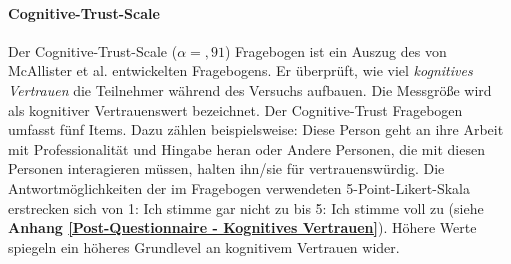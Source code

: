 \documentclass[a4paper,11pt]{article}%
\renewcommand{\\}{\vspace*{0.5\baselineskip} \newline}
\begin{document}
{%

		\paragraph{Cognitive-Trust-Scale}
Der Cognitive-Trust-Scale ($\alpha =,91$) Fragebogen ist ein Auszug des von McAllister et al. \citep[S. 37]{mcallister1995affect} entwickelten Fragebogens. Er überprüft, wie viel \textit{kognitives Vertrauen} die Teilnehmer während des Versuchs aufbauen. Die Messgröße wird als kognitiver Vertrauenswert bezeichnet. Der Cognitive-Trust Fragebogen umfasst fünf Items. Dazu zählen beispielsweise: \glqq{}Diese Person geht an ihre Arbeit mit Professionalität und Hingabe heran\dq{} oder \glqq{}Andere Personen, die mit diesen Personen interagieren müssen, halten ihn/sie für vertrauenswürdig\dq{}. Die Antwortmöglichkeiten der im Fragebogen verwendeten 5-Point-Likert-Skala erstrecken sich von 1: \glqq{}Ich stimme gar nicht zu \dq{} bis 5: \glqq{}Ich stimme voll zu\dq{} (siehe \textbf{Anhang \ref{Post-Questionnaire - Kognitives Vertrauen}}). Höhere Werte spiegeln ein höheres Grundlevel an kognitivem Vertrauen wider.


}
\end{document}

